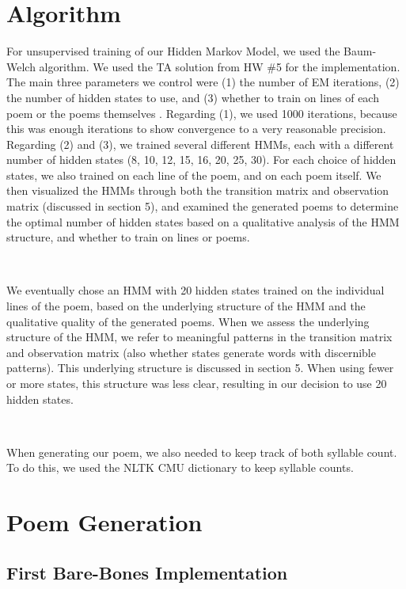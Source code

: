 \section{Algorithm}

\medskip

For unsupervised training of our Hidden Markov Model, we used the Baum-Welch algorithm. We used the TA solution from HW \#5 for the implementation. The main three parameters we control were (1) the number of EM iterations, (2) the number of hidden states to use, and (3) whether to train on lines of each poem or the poems themselves  . Regarding (1), we used 1000 iterations, because this was enough iterations to show convergence to a very reasonable precision. Regarding (2) and (3), we trained several different HMMs, each with a different number of hidden states (8, 10, 12, 15, 16, 20, 25, 30). For each choice of hidden states, we also trained on each line of the poem, and on each poem itself. We then visualized the HMMs through both the transition matrix and observation matrix  (discussed in section 5), and examined the generated poems to determine the optimal number of hidden states based on a qualitative analysis of the HMM structure, and whether to train on lines or poems.

~

We eventually chose an HMM with 20 hidden states trained on the individual lines of the poem, based on the underlying structure of the HMM and the qualitative quality of the generated poems. When we assess the underlying structure of the HMM, we refer to meaningful patterns in the transition matrix and observation matrix (also whether states generate words with discernible patterns). This underlying structure is discussed in section 5. When using fewer or more states, this structure was less clear, resulting in our decision to use 20 hidden states. 

~

When generating our poem, we also needed to keep track of both syllable count. To do this, we used the NLTK CMU dictionary to keep syllable counts.


\medskip

\section{Poem Generation}

\subsection*{First Bare-Bones Implementation}

